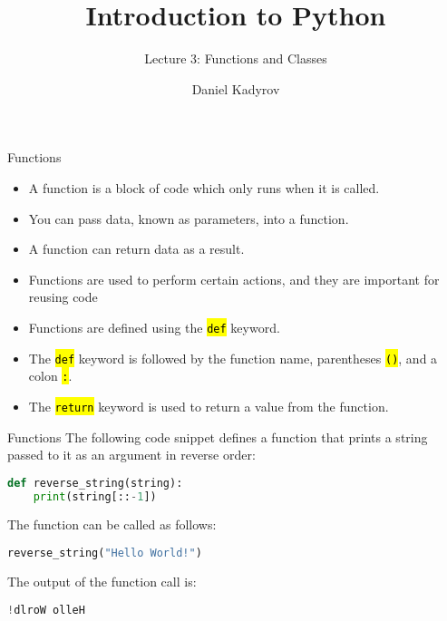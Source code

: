 \documentclass[
    aspectratio=169, 
    usepdftitle=false, 
    xcolor={dvipsnames},
    hyperref={
        colorlinks,
        linkcolor=black,
        urlcolor=blue}
    ]{beamer}
\title[Introduction to Python]{Introduction to Python}
\subtitle{Lecture 3: Functions and Classes}
\author{Daniel Kadyrov}
\date{}
\let\OldTexttt\texttt
\renewcommand{\texttt}[1]{\OldTexttt{\hl{#1}}}%
\begin{document}
\begin{frame}
    \titlepage
\end{frame}

\begin{frame}{Functions}
    \begin{itemize}
        \item A function is a block of code which only runs when it is called.
        \item You can pass data, known as parameters, into a function.
        \item A function can return data as a result.
        \item Functions are used to perform certain actions, and they are important for reusing code
        \item Functions are defined using the \texttt{def} keyword.
        \item The \texttt{def} keyword is followed by the function name, parentheses \texttt{()}, and a colon \texttt{:}.
        \item The \texttt{return} keyword is used to return a value from the function.
    \end{itemize}
\end{frame}

\begin{frame}[fragile]{Functions}
    The following code snippet defines a function that prints a string passed to it as an argument in reverse order: 

    \begin{lstlisting}[language=Python]
def reverse_string(string):
    print(string[::-1])
    \end{lstlisting}

    The function can be called as follows:

    \begin{lstlisting}[language=Python]
reverse_string("Hello World!")
    \end{lstlisting}

    The output of the function call is:

    \begin{lstlisting}[language=Python]
!dlroW olleH
    \end{lstlisting}
\end{frame}
\end{document}
